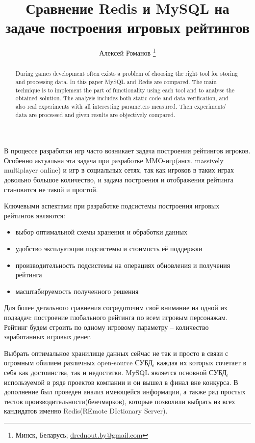 \documentclass[10pt, a5paper]{article}
\begin{document}
\title{Сравнение Redis и MySQL на задаче построения игровых рейтингов}
\author{Алексей Романов \footnote{Минск, Беларусь; \url{drednout.by@gmail.com}}}
\maketitle
\begin{abstract}
During games development  often exists a problem of choosing the right tool for storing and processing data. In this paper MySQL and Redis are compared. The main technique is to \linebreak implement the part of functionality using each  tool and to analyse the obtained solution. The analysis includes both static code and data verification, and also real experiments with all interesting parameters measured. Then experiments' data are processed and given results are  objectively compared.
\end{abstract}
В процессе разработки игр часто возникает задача построения рейтингов игроков. Особенно актуальна эта задача при разработке MMO-игр(англ. massively multiplayer online) и игр в социальных сетях, так как игроков в таких играх довольно большое количество, и задача построения и отображения рейтинга становится не такой и простой.

Ключевыми аспектами при разработке подсистемы построения игровых рейтингов являются:

\begin{itemize}
  \item выбор оптимальной схемы хранения и обработки данных
  \item удобство эксплуатации подсистемы и стоимость её поддержки
  \item производительность подсистемы на операциях обновления и получения рейтинга
  \item масштабируемость полученного решения
\end{itemize}

Для более детального сравнения сосредоточим своё внимание на одной из подзадач: построение глобального рейтинга по всем игровым персонажам. Рейтинг будем строить по одному игровому параметру -- количество заработанных игровых денег.

Выбрать оптимальное хранилище данных сейчас не так и просто в связи с огромным обилием различных open-source СУБД, каждая их которых сочетает в себя как достоинства, так и недостатки. MySQL является основной СУБД, используемой в ряде проектов компании и он вышел в финал вне конкурса. В дополнение был проведен анализ имеющейся информации, а также ряд простых тестов производительности(бенчмарков), которые позволили выбрать из всех кандидатов именно Redis(REmote DIctionary Server).
\end{document}
